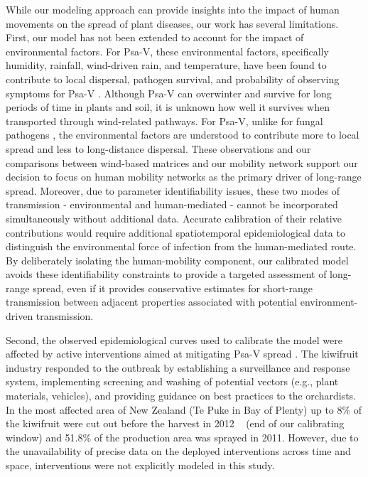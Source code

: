 \documentclass[aps,physrev,reprint,superscriptaddress]{revtex4-1}
\begin{document}
While our modeling approach can provide insights into the impact of human movements on the spread of plant diseases, our work has several limitations. First, our model has not been extended to account for the impact of environmental factors. For Psa-V, these environmental factors, specifically humidity, rainfall, wind-driven rain, and temperature, have been found to contribute to local dispersal, pathogen survival, and probability of observing symptoms for Psa-V \cite{froud2015review, deng2023survival}. Although Psa-V can overwinter\cite{deng2023survival} and survive for long periods of time in plants and soil, it is unknown how well it survives when transported through wind-related pathways. For Psa-V, unlike for fungal pathogens \cite{radici2022early,leyronas2018assessing}, the environmental factors are understood to contribute more to local spread and less to long-distance dispersal. These observations and our comparisons between wind-based matrices and our mobility network support our decision to focus on human mobility networks as the primary driver of long-range spread. Moreover, due to parameter identifiability issues, these two modes of transmission - environmental and human-mediated - cannot be incorporated simultaneously without additional data. Accurate calibration of their relative contributions would require additional spatiotemporal epidemiological data to distinguish the environmental force of infection from the human-mediated route. By deliberately isolating the human-mobility component, our calibrated model avoids these identifiability constraints to provide a targeted assessment of long-range spread, even if it provides conservative estimates for short-range transmission between adjacent properties associated with potential environment-driven transmission.    

Second, the observed epidemiological curves used to calibrate the model were affected by active interventions aimed at mitigating Psa-V spread \cite{greer2012costs,birnie2014lessons}. The kiwifruit industry responded to the outbreak by establishing a surveillance and response system, implementing screening and washing of potential vectors (e.g., plant materials, vehicles), and providing guidance on best practices to the orchardists. In the most affected area of New Zealand (Te Puke in Bay of Plenty) up to 8\% of the kiwifruit were cut out before the harvest in 2012 ~\cite{greer2012costs} (end of our calibrating window) and 51.8\% of the production area was sprayed in 2011. However, due to the unavailability of precise data on the deployed interventions across time and space, interventions were not explicitly modeled in this study. 
\end{document}
